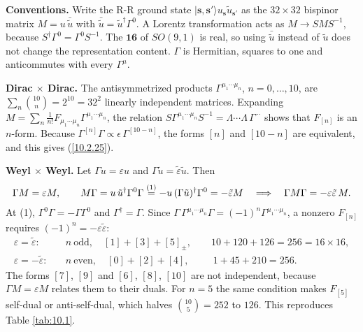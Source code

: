 	\begin{tcolorbox}[breakable]
		\begin{remark}
			\textbf{Conventions.} Write the R-R ground state $\lvert\mathbf s,\mathbf s'\rangle u_{\mathbf s}\tilde u_{\mathbf s'}$ as the $32\times32$ bispinor matrix $M=u\,\bar{\tilde u}$ with $\bar{\tilde u}=\tilde u^{\dagger}\Gamma^{0}$. A Lorentz transformation acts as $M\to SMS^{-1}$, because $S^{\dagger}\Gamma^0=\Gamma^0S^{-1}$. The $\mathbf{16}$ of $SO(9,1)$ is real, so using $\bar{\tilde u}$ instead of $\tilde u$ does not change the representation content. $\Gamma$ is Hermitian, squares to one and anticommutes with every $\Gamma^\mu$.

			\textbf{Dirac $\times$ Dirac.} The antisymmetrized products $\Gamma^{\mu_1\cdots\mu_n}$, $n=0,\dots,10$, are $\sum_n\binom{10}{n}=2^{10}=32^{2}$ linearly independent matrices. Expanding $M=\sum_n\frac1{n!}F_{\mu_1\cdots\mu_n}\Gamma^{\mu_1\cdots\mu_n}$, the relation $S\Gamma^{\mu_1\cdots\mu_n}S^{-1}=\Lambda\cdots\Lambda\,\Gamma^{\cdots}$ shows that $F_{[n]}$ is an $n$-form. Because $\Gamma^{[n]}\Gamma\propto\epsilon\,\Gamma^{[10-n]}$, the forms $[n]$ and $[10-n]$ are equivalent, and this gives (\ref{10.2.25}).

			\textbf{Weyl $\times$ Weyl.} Let $\Gamma u=\varepsilon u$ and $\Gamma\tilde u=\tilde\varepsilon\tilde u$. Then
			\begin{align*}
				\Gamma M=\varepsilon M,\qquad M\Gamma=u\,\tilde u^{\dagger}\Gamma^{0}\Gamma\overset{(1)}{=}-u\,(\Gamma\tilde u)^{\dagger}\Gamma^{0}=-\tilde\varepsilon M
				\quad\Longrightarrow\quad \Gamma M\Gamma=-\varepsilon\tilde\varepsilon\,M .
			\end{align*}
			At (1), $\Gamma^0\Gamma=-\Gamma\Gamma^0$ and $\Gamma^{\dagger}=\Gamma$. Since $\Gamma\,\Gamma^{\mu_1\cdots\mu_n}\Gamma=(-1)^{n}\Gamma^{\mu_1\cdots\mu_n}$, a nonzero $F_{[n]}$ requires $(-1)^n=-\varepsilon\tilde\varepsilon$:
			\begin{align*}
				\varepsilon=\tilde\varepsilon:&\quad n\ \text{odd},\quad [1]+[3]+[5]_{\pm},\qquad 10+120+126=256=16\times16,\\
				\varepsilon=-\tilde\varepsilon:&\quad n\ \text{even},\quad [0]+[2]+[4],\qquad\ \ 1+45+210=256 .
			\end{align*}
			The forms $[7]$, $[9]$ and $[6]$, $[8]$, $[10]$ are not independent, because $\Gamma M=\varepsilon M$ relates them to their duals. For $n=5$ the same condition makes $F_{[5]}$ self-dual or anti-self-dual, which halves $\binom{10}{5}=252$ to $126$. This reproduces Table \ref{tab:10.1}.
		\end{remark}
	\end{tcolorbox}

